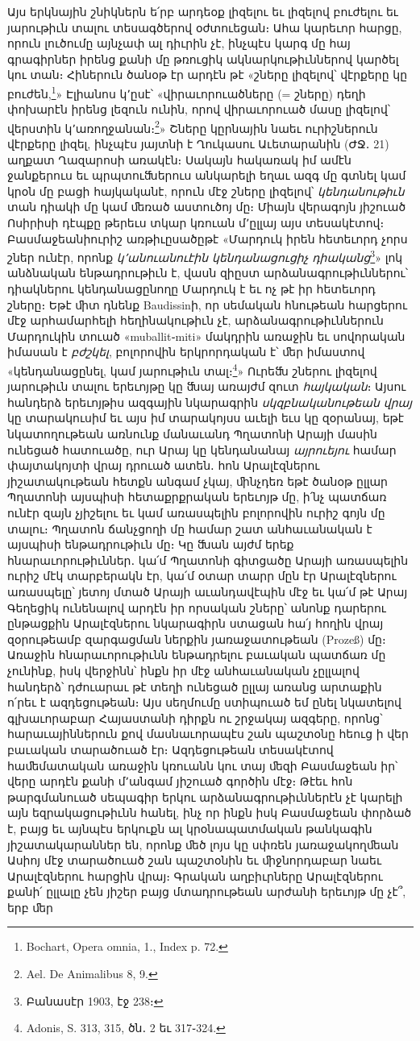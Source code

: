 \documentclass{article}
\begin{document}
{Այս երկնային շնիկներն ե՛րբ արդեօք լիզելու եւ լիզելով բուժելու եւ յարութիւն տալու տեսագծերով օժտուեցան։ Ահա կարեւոր հարցը, որուն լուծումը այնչափ ալ դիւրին չէ, ինչպէս կարգ մը հայ գրագիրներ իրենց քանի մը թռուցիկ ակնարկութիւններով կարծել կու տան։ Հիներուն ծանօթ էր արդէն թէ «շները լիզելով՝ վէրքերը կը բուժեն,\footnote{Bochart, Opera omnia, 1., Index p. 72.}» Էլիանոս կ՚ըսէ՝ «վիրաւորուածները (= շները) դեղի փոխարէն իրենց լեզուն ունին, որով վիրաւորուած մասը լիզելով՝ վերստին կ՚առողջանան։\footnote{Ael. De Animalibus 8, 9.}» Շները կըրնային նաեւ ուրիշներուն վէրքերը լիզել, ինչպէս յայտնի է Ղուկասու Աւետարանին (ԺՋ․ 21) աղքատ Ղազարոսի առակէն։ Սակայն հակառակ իմ ամէն ջանքերուս եւ պրպտուﬓերուս անկարելի եղաւ ազգ մը գտնել կամ կրօն մը բացի հայկականէ, որուն մէջ շները լիզելով՝ \emph{կենդանութիւն} տան դիակի մը կամ ﬔռած աստուծոյ մը։ Միայն վերագոյն յիշուած Ոսիրիսի դէպքը թերեւս տկար կռուան մ՚ըլլայ այս տեսակէտով։ Բասմաջեանիուրիշ առթիւըսածըթէ «Մարդուկ իրեն հետեւորդ չորս շներ ունէր, որոնք \emph{կ՚անուանուէին կենդանացուցիչ դիականց}\footnote{Բանասէր 1903, էջ 238։}» լոկ անձնական ենթադրութիւն է, վասն զիըստ արձանագրութիւններու՝ դիակներու կենդանացընողը Մարդուկ է եւ ոչ թէ իր հետեւորդ շները։ Եթէ ﬕտ դնենք Baudissinի, որ սեմական հնութեան հարցերու մէջ արհամարհելի հեղինակութիւն չէ, արձանագրութիւններուն Մարդուկին տուած «muballit֊miti» մակդրին առաջին եւ սովորական իմասան է \emph{բժշկել}, բոլորովին երկրորդական է՝ ﬔր իմաստով «կենդանացընել, կամ յարութիւն տալ։\footnote{Adonis, S. 313, 315, ծն․ 2 եւ 317֊324.}» Ուրեﬓ շներու լիզելով յարութիւն տալու երեւոյթը կը ﬓայ առայժմ զուտ \emph{հայկական}։ Այսու հանդերձ երեւոյթիս ազգային նկարագրին \emph{սկզբնականութեան վրայ} կը տարակուսիմ եւ այս իմ տարակոյսս աւելի եւս կը զօրանայ, եթէ նկատողութեան առնունք մանաւանդ Պղատոնի Արայի մասին ունեցած հատուածը, ուր Արայ կը կենդանանայ \emph{այրուեյու} համար փայտակոյտի վրայ դրուած ատեն․ հոն Արալէզներու յիշատակութեան հետքն անգամ չկայ, ﬕնչդեռ եթէ ծանօթ ըլլար Պղատոնի այսպիսի հետաքրքրական երեւոյթ մը, ի՛նչ պատճառ ունէր զայն չյիշելու եւ կամ առասպելին բոլորովին ուրիշ գոյն մը տալու։ Պղատոն ճանչցողի մը համար շատ անհաւանական է այսպիսի ենթադրութիւն մը։ Կը ﬓան այժմ երեք հնարաւորութիւններ․ կա՛մ Պղատոնի գիտցածը Արայի առասպելին ուրիշ մէկ տարբերակն էր, կա՛մ օտար տարր մըն էր Արալէզներու առասպելը՝ յետոյ մտած Արայի աւանդավէպին մէջ եւ կա՛մ թէ Արայ Գեղեցիկ ունենալով արդէն իր որսական շները՝ անոնք դարերու ընթացքին Արալէզներու նկարագիրն ստացան հա՛յ հողին վրայ զօրութեամբ զարգացման ներքին յառաջատութեան (Prozeß) մը։ Առաջին հնարաւորութիւնն ենթադրելու բաւական պատճառ մը չունինք, իսկ վերջինն՝ ինքն իր մէջ անհաւանական չըլլալով հանդերձ՝ դժուարաւ թէ տեղի ունեցած ըլլայ առանց արտաքին ո՛րեւ է ազդեցութեան։ Այս սեղմումը ստիպուած եմ ընել նկատելով գլխաւորաբար Հայաստանի դիրքն ու շրջակայ ազգերը, որոնց՝ հարաւայիններուն քով մասնաւորապէս շան պաշտօնը հեուց ի վեր բաւական տարածուած էր։ Ազդեցութեան տեսակէտով հաﬔմատական առաջին կռուանն կու տայ ﬔզի Բասմաջեան իր՝ վերը արդէն քանի մ՚անգամ յիշուած գործին մէջ։ Թէեւ հոն թարգմանուած սեպագիր երկու արձանագրութիւններէն չէ կարելի այն եզրակացութիւնն հանել, ինչ որ ինքն իսկ Բասմաջեան փորձած է, բայց եւ այնպէս երկուքն ալ կրօնապատմական թանկագին յիշատակարաններ են, որոնք ﬔծ լոյս կը սփռեն յառաջակողﬔան Ասիոյ մէջ տարածուած շան պաշտօնին եւ ﬕջնորդաբար նաեւ Արալէզներու հարցին վրայ։ Գրական աղբիւրները Արալէզներու քանի՛ ըլլալը չեն յիշեր բայց մտադրութեան արժանի երեւոյթ մը չէ՞, երբ ﬔր }
\end{document}
